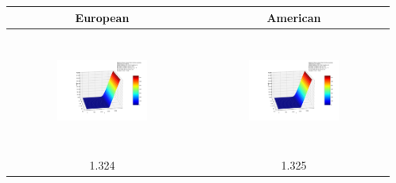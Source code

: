 \documentclass[10pt,a4paper]{article}
\begin{document}
	\begin{table}
	\begin{tabular}{|c|c|}
		\hline
		European & American \\
		\hline
		\includegraphics[width=0.5\textwidth, height=40mm]{Black-Scholes_K1600.0_sigma0.2_r0.01_T0.9_linear_european.png}
		& \includegraphics[width=0.5\textwidth, height=40mm]{Black-Scholes_K1600.0_sigma0.2_r0.01_T0.9_linear_american.png} \\
		1.324
		& 1.325 \\


\end{tabular}
\end{table}
\end{document}
